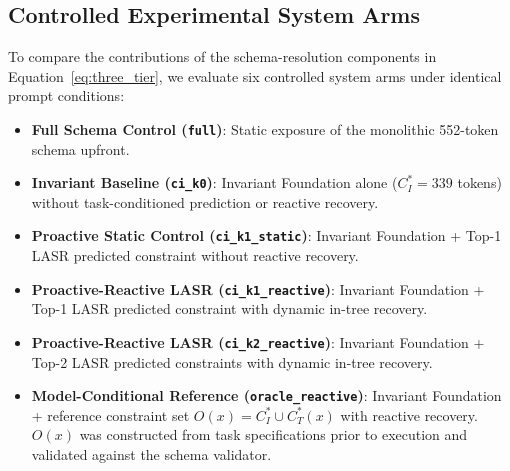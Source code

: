 \subsection{Controlled Experimental System Arms}
To compare the contributions of the schema-resolution components in Equation~\eqref{eq:three_tier}, we evaluate six controlled system arms under identical prompt conditions:
\begin{itemize}
    \item \textbf{Full Schema Control (\texttt{full})}: Static exposure of the monolithic 552-token schema upfront.
    \item \textbf{Invariant Baseline (\texttt{ci\_k0})}: Invariant Foundation alone ($C_I^* = 339$ tokens) without task-conditioned prediction or reactive recovery.
    \item \textbf{Proactive Static Control (\texttt{ci\_k1\_static})}: Invariant Foundation + Top-1 LASR predicted constraint without reactive recovery.
    \item \textbf{Proactive-Reactive LASR (\texttt{ci\_k1\_reactive})}: Invariant Foundation + Top-1 LASR predicted constraint with dynamic in-tree recovery.
    \item \textbf{Proactive-Reactive LASR (\texttt{ci\_k2\_reactive})}: Invariant Foundation + Top-2 LASR predicted constraints with dynamic in-tree recovery.
    \item \textbf{Model-Conditional Reference (\texttt{oracle\_reactive})}: Invariant Foundation + reference constraint set $O(x) = C_I^* \cup C_T^*(x)$ with reactive recovery. $O(x)$ was constructed from task specifications prior to execution and validated against the schema validator.
\end{itemize}

